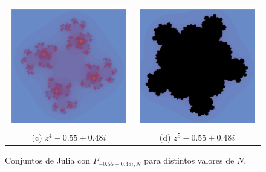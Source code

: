 \begin{figure}[ht]
\begin{tabular}{cc}
  \includegraphics[scale=0.37]{./img/C3/julia-generalizado-4.png} &   \includegraphics[scale=0.37]{./img/C3/julia-generalizado-5.png} \\
  (c) $z^4-0.55+0.48i$ & (d) $z^5-0.55+0.48i$ \\[6pt]
  \end{tabular}
  \caption{Conjuntos de Julia con $P_{-0.55+0.48i, N}$ para distintos valores de $N$.}
  \label{fig:julia-generalizados}
\end{figure}


